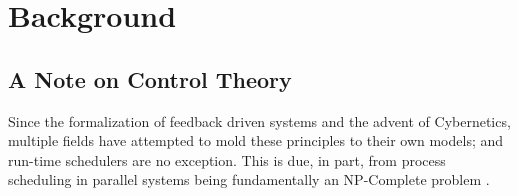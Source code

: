 \chapter{Background}
%
\label{chap:background}



\section{A Note on Control Theory}
\label{sec:a note on control theory}

Since the formalization of feedback driven systems and the advent of 
Cybernetics, multiple fields have attempted to mold these principles to their 
own models; and run-time schedulers are no exception. This is due, in part, from
process scheduling in parallel systems being fundamentally an NP-Complete 
problem \cite{bruno1976computer}. 

